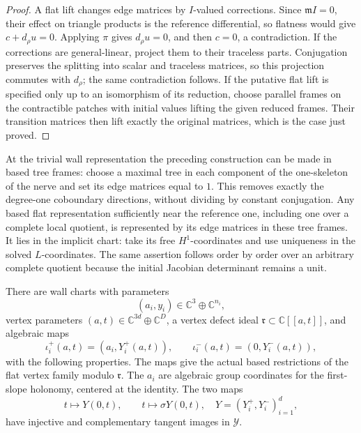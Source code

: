 \begin{proof}
A flat lift changes edge matrices by \(I\)-valued corrections.
Since \(\mathfrak mI=0\), their effect on triangle products is
the reference differential, so flatness would give
\(c+d_\rho u=0\).  Applying \(\pi\) gives \(d_\rho u=0\), and
then \(c=0\), a contradiction.  If the corrections are
general-linear, project them to their traceless parts.
Conjugation preserves the splitting into scalar and traceless
matrices, so this projection commutes with \(d_\rho\);
the same contradiction follows.  If the putative flat lift is
specified only up to an isomorphism of its reduction, choose
parallel frames on the contractible patches with initial
values lifting the given reduced frames.  Their transition
matrices then lift exactly the original matrices, which is the
case just proved.
\end{proof}

\begin{remark}
\label{def:based-wall}
At the trivial wall representation the preceding construction can
be made in based tree frames: choose a maximal tree in each
component of the one-skeleton of the nerve and set its edge
matrices equal to \(1\).  This removes exactly the degree-one
coboundary directions, without dividing by constant conjugation.
Any based flat representation sufficiently near the reference
one, including one over a complete local quotient, is represented
by its edge matrices in these tree frames.  It lies in the implicit
chart: take its free \(H^1\)-coordinates and use uniqueness in the
solved \(L\)-coordinates.  The same assertion follows order by
order over an arbitrary complete quotient because the initial
Jacobian determinant remains a unit.
\end{remark}

\begin{proposition}
\label{def:restriction-charts}
There are wall charts with parameters
\[
 (a_i,y_i)\in\mathbb C^3\oplus\mathbb C^{n_i},
\]
vertex parameters
\((a,t)\in\mathbb C^{3d}\oplus\mathbb C^D\), a vertex defect ideal
\(\mathfrak r\subset\mathbb C[[a,t]]\), and algebraic maps
\begin{equation}
 \iota_i^+(a,t)=(a_i,Y_i^+(a,t)),\qquad
 \iota_i^-(a,t)=(0,Y_i^-(a,t)),
 \label{def:restriction-maps}
\end{equation}
with the following properties.  The maps give the actual based
restrictions of the flat vertex family modulo \(\mathfrak r\).
The \(a_i\) are algebraic group coordinates for the first-slope
holonomy, centered at the identity.  The two maps
\[
 t\longmapsto Y(0,t),\qquad
 t\longmapsto \sigma Y(0,t),
 \quad Y=(Y_i^+,Y_i^-)_{i=1}^d,
\]
have injective and complementary tangent images in \(\mathcal Y\).
\end{proposition}

